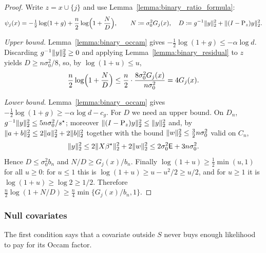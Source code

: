 \documentclass[aos]{imsart}%
\DeclarePairedDelimiter{\norm}{\lVert}{\rVert}
\theoremstyle{plain}
\theoremstyle{definition}
\begin{document}
    \begin{proof}
        Write $z=x\cup\{j\}$ and use Lemma~\ref{lemma:binary_ratio_formula}:
        \begin{equation}
            \label{eq:binary_transfer_split}
            \psi_j(x)=-\tfrac12\log(1+g)
            +\frac n2\log\Bigl(1+\frac{N}{D}\Bigr),
            \qquad
            N\coloneq\sigma_0^{2}G_j(x),
            \quad
            D\coloneq g^{-1}\norm y_2^{2}+\norm{(I-\Proj_z)y}_2^{2}.
        \end{equation}

        \emph{Upper bound.} Lemma~\ref{lemma:binary_occam} gives
        $-\tfrac12\log(1+g)\leq-\alpha\log d$. Discarding $g^{-1}\norm
        y_2^{2}\geq0$ and applying Lemma~\ref{lemma:binary_residual} to $z$
        yields $D\geq n\sigma_0^{2}/8$, so, by $\log(1+u)\leq u$,
        \begin{equation*}
            \frac n2\log\Bigl(1+\frac ND\Bigr)\leq\frac n2\cdot
            \frac{8\sigma_0^{2}G_j(x)}{n\sigma_0^{2}}=4G_j(x).
        \end{equation*}

        \emph{Lower bound.} Lemma~\ref{lemma:binary_occam} gives
        $-\tfrac12\log(1+g)\geq-\alpha\log d-c_g$. For $D$ we need an upper
        bound. On $D_n$, $g^{-1}\norm y_2^{2}\leq5n\sigma_0^{2}/s^{\star}$;
        moreover $\norm{(I-\Proj_z)y}_2^{2}\leq\norm y_2^{2}$ and, by
        $\norm{a+b}_2^{2}\leq2\norm a_2^{2}+2\norm b_2^{2}$ together with the
        bound $\norm w_2^{2}\leq\tfrac32n\sigma_0^{2}$ valid on $C_n$,
        \begin{equation*}
            \norm y_2^{2}\leq2\norm{X\beta^\star}_2^{2}+2\norm w_2^{2}
            \leq2\sigma_0^{2}\Energy+3n\sigma_0^{2}.
        \end{equation*}
        Hence $D\leq\sigma_0^{2}b_n$ and $N/D\geq G_j(x)/b_n$. Finally
        $\log(1+u)\geq\tfrac12\min(u,1)$ for all $u\geq0$: for $u\leq1$ this is
        $\log(1+u)\geq u-u^{2}/2\geq u/2$, and for $u\geq1$ it is
        $\log(1+u)\geq\log2\geq1/2$. Therefore
        $\tfrac n2\log(1+N/D)\geq\tfrac n4\min\{G_j(x)/b_n,1\}$.
    \end{proof}

    \subsubsection{Null covariates}

    The first condition says that a covariate outside $S$ never buys enough
    likelihood to pay for its Occam factor.
\end{document}
